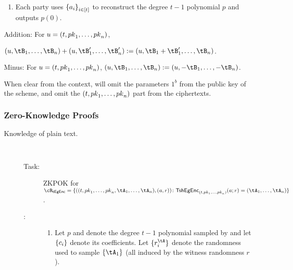 {\begin{algorithm}
\begin{enumerate}
\begin{enumerate}
			\item  Send $a_i$ to other parties.\footnote{Depending on the context, we might ask $\Pc_{u_i}$ to prove that $a_i$ is  the correct decryption of $\tA_{u_i}$. This can be  done using   \piZKPOK{\rEgConsSk}.}
		\end{enumerate} 
		
		\item Each party uses $\set{a_i}_{i\in [t]}$ to reconstruct 	the degree $t-1$ polynomial $p$ and  outputs $p(0)$.
		
		
	\end{enumerate}
	
	\item[Addition:] For $u = (t,{pk}_1,\ldots,{pk}_n)$, 
	
	$(u,\tB_1,\ldots,\tB_n) + (u,\tB_1',\ldots,\tB_n') \eqdef (u,\tB_1+\tB_1',\ldots,\tB_n)$.
	
	
	\item[Minus:]  For $u = (t,{pk}_1,\ldots,{pk}_n)$,  $(u,\tB_1,\ldots,\tB_n) \eqdef (u,-\tB_1,\ldots,-\tB_n) $.
	
\end{algorithm}	
When clear from the context,  will omit the parameters $1^b$ from the public key of the scheme, and omit the  $(t,{pk}_1,\ldots,{pk}_n)$ part  from the ciphertexts.


\newcommand{\TsEgEncs}{{{\sf tEgEnc}}}
\newcommand{\rTsEgEnc}{\cR_\TsEgEncs}
\newcommand{\rTsEgEncDef}
{
	\sset{((t,\pk_1,\ldots,\pk_n,\tA_1,\ldots,\tA_n),(a,r))\colon \tsEgEnc_{(t,\pk_1,\ldots,\pk_n)}(a;r)= (\tA_1,\ldots,\tA_n)}
}



\subsubsection{Zero-Knowledge Proofs}\label{sec:ChanksEg:tsEGinExp:ZK}


\begin{description}




\item[Knowledge of plain text.] ~

\begin{description}
	\item[Task:] ZKPOK for  $\rTsEgEnc=\rTsEgEncDef$.
	
	\item[\Pc:]   

	\begin{enumerate}
	\item Let $p$  and denote the degree $t-1$ polynomial  sampled by \tsEgEnc and let $\{c_i\}$ denote its coefficients.   Let $\sset{r_i^{\tA}}$ denote the  randomness used to sample $\set{\tA_1}$  (all induced by the  witness randomness $r$).
	

\end{enumerate}
\end{description}
\end{description}}
